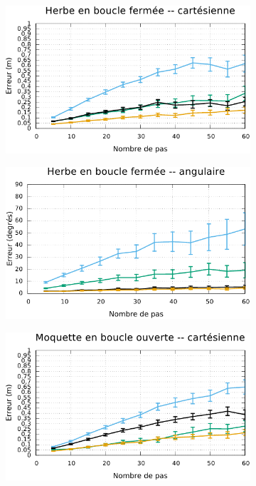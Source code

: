 \begin{figure}[htbp]
\begin{subfigure}{0.37\paperwidth}
    \end{subfigure}
    \newline
    \begin{subfigure}{0.37\paperwidth}
        \centering
        \includegraphics[type=pdf,ext=.pdf,read=.pdf,width=1.0\linewidth]{../plot/OdometryLWPR/grass_close_compare_cart}
    \end{subfigure}
    \begin{subfigure}{0.37\paperwidth}
        \centering
        \includegraphics[type=pdf,ext=.pdf,read=.pdf,width=1.0\linewidth]{../plot/OdometryLWPR/grass_close_compare_angle}
    \end{subfigure}
    \newline
    \begin{subfigure}{0.37\paperwidth}
        \centering
        \includegraphics[type=pdf,ext=.pdf,read=.pdf,width=1.0\linewidth]{../plot/OdometryLWPR/carpet_open_compare_cart}

\end{subfigure}
\end{figure}
